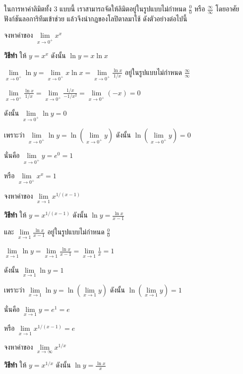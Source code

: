 \documentclass[
]{book}
\begin{document}
ในการหาค่าลิมิตทั้ง 3 แบบนี้ เราสามารถจัดให้ลิมิตอยู่ในรูปแบบไม่กำหนด
\(\displaystyle \frac{0}{0}\) หรือ
\(\displaystyle \frac{\infty }{\infty }\) โดยอาศัยฟังก์ชันลอการิทึมเข้าช่วย
แล้วจึงนำกฎของโลปิตาลมาใช้ ดังตัวอย่างต่อไปนี้

จงหาค่าของ \(\mathop {\lim }\limits_{x\to 0^+} x^x\)

\textbf{วิธีทำ} ให้ \(y=x^x\) ดังนั้น \(\ln y=x\ln x\)

\(\displaystyle \mathop {\lim }\limits_{x\to 0^+} \ln y=\mathop {\lim
}\limits_{x\to 0^+}
x\ln x=\mathop {\lim }\limits_{x\to 0^+} \frac{\ln x}{1/x}\)
อยู่ในรูปแบบไม่กำหนด \(\displaystyle \frac{\infty }{\infty }\)

\(\displaystyle \mathop {\lim }\limits_{x\to 0^+} \frac{\ln x}{1/x}=\mathop
{\lim
}\limits_{x\to 0^+} \frac{1/x}{-1/x^2}=\mathop {\lim }\limits_{x\to 0^+}
(-x)=0\)

ดังนั้น \(\mathop {\lim }\limits_{x\to 0^+} \ln y=0\)

เพราะว่า \(\mathop {\lim }\limits_{x\to 0^+} \ln y=\ln (\mathop {\lim
}\limits_{x\to 0^+} y)\) ดังนั้น \(\ln (\mathop {\lim }\limits_{x\to 0^+}
y)=0\)

นั่นคือ \(\mathop {\lim }\limits_{x\to 0^+} y=e^0=1\)

หรือ \(\mathop {\lim }\limits_{x\to 0^+} x^x=1\)

จงหาค่าของ \(\mathop {\lim }\limits_{x\to 1} x^{1/(x-1)}\)

\textbf{วิธีทำ} ให้ \(y=x^{1/(x-1)}\) ดังนั้น
\(\displaystyle \ln y=\frac{\ln x}{x-1}\)

และ \(\displaystyle \mathop {\lim }\limits_{x\to 1} \frac{\ln x}{x-1}\)
อยู่ในรูปแบบไม่กำหนด \(\displaystyle \frac{0}{0}\)

\(\displaystyle \mathop {\lim }\limits_{x\to 1} \ln y=\mathop {\lim
}\limits_{x\to 1}
\frac{\ln x}{x-1}=\mathop {\lim }\limits_{x\to 1} \frac{1}{x}=1\)

ดังนั้น \(\mathop {\lim }\limits_{x\to 1} \ln y=1\)

เพราะว่า \(\mathop {\lim }\limits_{x\to 1} \ln y=\ln (\mathop {\lim
}\limits_{x\to 1} y)\) ดังนั้น
\(\ln (\mathop {\lim }\limits_{x\to 1} y)=1\)

นั่นคือ \(\mathop {\lim }\limits_{x\to 1} y=e^1=e\)

หรือ \(\mathop {\lim }\limits_{x\to 1} x^{1/(x-1)}=e\)

จงหาค่าของ \(\mathop {\lim }\limits_{x\to \infty } x^{1/x}\)

\textbf{วิธีทำ} ให้ \(y=x^{1/x}\) ดังนั้น
\(\displaystyle \ln y=\frac{\ln x}{x}\)
\end{document}
